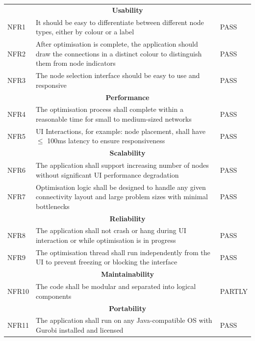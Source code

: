 \begin{longtable}{l p{12cm} l}
\multicolumn{3}{c}{\textbf{Usability}}\\
NFR1 & It should be easy to differentiate between different node types, either by colour or a label & PASS\\
NFR2 & After optimisation is complete, the application should draw the connections in a distinct colour to distinguish them from node indicators & PASS\\
NFR3 & The node selection interface should be easy to use and responsive & PASS\\
\midrule
\multicolumn{3}{c}{\textbf{Performance}}\\
NFR4 & The optimisation process shall complete within a reasonable time for small to medium-sized networks & PASS\\
NFR5 & UI Interactions, for example: node placement, shall have $\leq$ 100ms latency to ensure responsiveness & PASS\\
\midrule
\multicolumn{3}{c}{\textbf{Scalability}}\\
NFR6 & The application shall support increasing number of nodes without significant UI performance degradation & PASS\\
NFR7 & Optimisation logic shall be designed to handle any given connectivity layout and large problem sizes with minimal bottlenecks & PASS\\
\midrule
\multicolumn{3}{c}{\textbf{Reliability}}\\
NFR8 & The application shall not crash or hang during UI interaction or while optimisation is in progress & PASS\\
NFR9 & The optimisation thread shall run independently from the UI to prevent freezing or blocking the interface & PASS\\
\midrule
\multicolumn{3}{c}{\textbf{Maintainability}}\\
NFR10 & The code shall be modular and separated into logical components & PARTLY\\
\midrule
\multicolumn{3}{c}{\textbf{Portability}}\\
NFR11 & The application shall run on any Java-compatible OS with Gurobi installed and licensed & PASS\\
\end{longtable}


